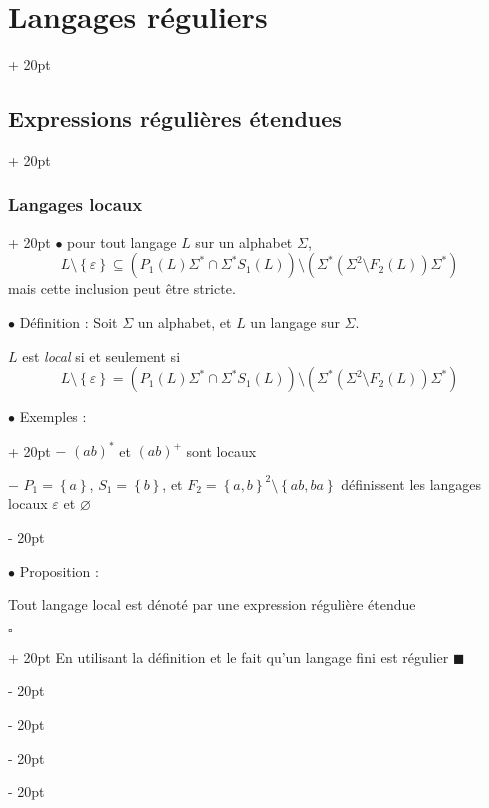 \documentclass[a4paper, 12pt, twoside]{article}
\newcommand{\lr}[1]{\left( #1 \right)}
\newcommand{\set}[1]{\left\{ #1 \right\}}
\newcommand{\ind}[1][20pt]{\advance\leftskip + #1}
\newcommand{\deind}[1][20pt]{\advance\leftskip - #1}
\newenvironment{indt}[2][20pt]{#2 \par \ind[#1]}{\par \deind} %
\newenvironment{proof}[1][{}]{\begin{indt}{$\square$ #1}}{$\blacksquare$ \end{indt}}
\begin{document}
\begin{indt}{\section{Langages réguliers}}
\begin{indt}{\subsection{Expressions régulières étendues}}
            \vspace{12pt}
            
            \begin{indt}{\subsubsection{Langages locaux}}
                $\bullet$  pour tout langage $L$ sur un alphabet $\Sigma$,
                \[
                    L \setminus \set \varepsilon
                    \subseteq
                    \lr{P_1(L) \Sigma^* \cap \Sigma^* S_1(L)} \setminus \lr{\Sigma^*\lr{\Sigma^2 \setminus F_2(L)} \Sigma^*}
                \]
                mais cette inclusion peut être stricte.

                \vspace{12pt}
                
                $\bullet$ Définition : Soit $\Sigma$ un alphabet, et $L$ un langage sur $\Sigma$.

                $L$ est \emph{local} si et seulement si
                \[
                    L \setminus \set \varepsilon = \lr{P_1(L) \Sigma^* \cap \Sigma^* S_1(L)} \setminus \lr{\Sigma^*\lr{\Sigma^2 \setminus F_2(L)} \Sigma^*}
                \]

                \vspace{12pt}
                
                \begin{indt}{$\bullet$ Exemples :}
                    $-$ $(ab)^*$ et $(ab)^+$ sont locaux

                    $-$ $P_1 = \set a$, $S_1 = \set b$, et $F_2 = \set{a, b}^2 \setminus \set{ab, ba}$ définissent les langages locaux $\varepsilon$ et $\varnothing$
                \end{indt}

                \vspace{12pt}
                
                $\bullet$ Proposition :
                \begin{emphBox}
                    Tout langage local est dénoté par une expression régulière étendue
                \end{emphBox}

                \vspace{6pt}
                
                \begin{proof}
                    En utilisant la définition et le fait qu'un langage fini est régulier 
                \end{proof}


\end{indt}
\end{indt}
\end{indt}
\end{document}
